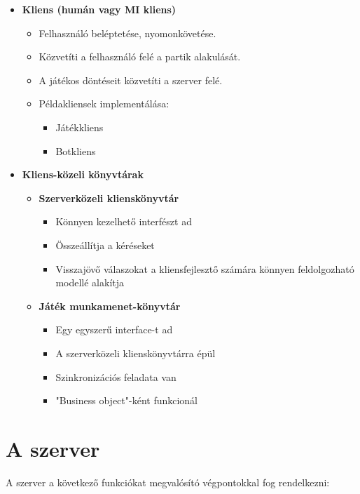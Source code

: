\documentclass[twoside, a4paper, 12pt]{book}
\begin{document}
\begin{itemize}
\begin{itemize}
		\item \textbf{Kliens (humán vagy MI kliens)}
		\begin{itemize}
			\item Felhasználó beléptetése, nyomonkövetése.
			\item Közvetíti a felhasználó felé a partik alakulását.
			\item A játékos döntéseit közvetíti a szerver felé.
			\item Példakliensek implementálása:
			\begin{itemize}
				\item Játékkliens
				\item Botkliens
			\end{itemize}
		\end{itemize}
		\item \textbf{Kliens-közeli könyvtárak}
		\begin{itemize}
			\item \textbf{Szerverközeli klienskönyvtár}
			\begin{itemize}
				\item Könnyen kezelhető interfészt ad
				\item Összeállítja a kéréseket
				\item Visszajövő válaszokat a kliensfejlesztő számára könnyen feldolgozható modellé alakítja
			\end{itemize}
			\item \textbf{Játék munkamenet-könyvtár}
			\begin{itemize}
				\item Egy egyszerű interface-t ad
				\item A szerverközeli klienskönyvtárra épül
				\item Szinkronizációs feladata van
				\item "Business object"-ként funkcionál
			\end{itemize}
		\end{itemize}
	\end{itemize}
\end{itemize}

\section{A szerver}

A szerver a következő funkciókat megvalósító végpontokkal fog rendelkezni:
\end{document}
